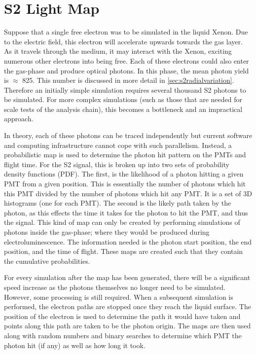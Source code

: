 \section{S2 Light Map}
\label{sec:s2lightmap}
\par
Suppose that a single free electron was to be simulated in the liquid Xenon.
Due to the electric field, this electron will accelerate upwards towards the gas layer.
As it travels through the medium, it may interact with the Xenon, exciting numerous other electrons into being free.
Each of these electrons could also enter the gas-phase and produce optical photons.
In this phase, the mean photon yield is $\approx$ 825.
This number is discussed in more detail in \autoref{sec:s2radialvariation}.
Therefore an initially simple simulation requires several thousand S2 photons to be simulated.
For more complex simulations (such as those that are needed for scale tests of the analysis chain), this becomes a bottleneck and an impractical approach.

\par
In theory, each of these photons can be traced independently but current software and computing infrastructure cannot cope with such parallelism. 
Instead, a probabilistic map is used to determine the photon hit pattern on the PMTs and flight time.
For the S2 signal, this is broken up into two sets of probability density functions (PDF).
The first, is the likelihood of a photon hitting a given PMT from a given position.
This is essentially the number of photons which hit this PMT divided by the number of photons which hit any PMT.
It is a set of 3D histograms (one for each PMT).
The second is the likely path taken by the photon, as this effects the time it takes for the photon to hit the PMT, and thus the signal.
This kind of map can only be created by performing simulations of photons inside the gas-phase; where they would be produced during electroluminescence. 
The information needed is the photon start position, the end position, and the time of flight.
These maps are created such that they contain the cumulative probabilities.

\par
For every simulation after the map has been generated, there will be a significant speed increase as the photons themselves no longer need to be simulated.
However, some processing is still required.
When a subsequent simulation is performed, the electron paths are stopped once they reach the liquid surface.
The position of the electron is used to determine the path it would have taken and points along this path are taken to be the photon origin. %
The maps are then used along with random numbers and binary searches to determine which PMT the photon hit (if any) as well as how long it took.

